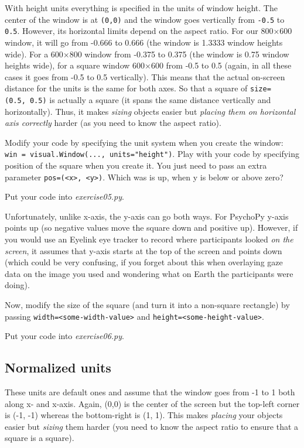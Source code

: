 \documentclass[
]{book}
\begin{document}
With height units everything is specified in the units of window height. The center of the window is at \texttt{(0,0)} and the window goes vertically from \texttt{-0.5} to \texttt{0.5}. However, its horizontal limits depend on the aspect ratio. For our 800×600 window, it will go from -0.666 to 0.666 (the window is 1.3333 window heights wide). For a 600×800 window from -0.375 to 0.375 (the window is 0.75 window heights wide), for a square window 600×600 from -0.5 to 0.5 (again, in all these cases it goes from -0.5 to 0.5 vertically). This means that the actual on-screen distance for the units is the same for both axes. So that a square of \texttt{size=(0.5,\ 0.5)} is actually a square (it spans the same distance vertically and horizontally). Thus, it makes \emph{sizing} objects easier but \emph{placing them on horizontal axis correctly} harder (as you need to know the aspect ratio).

Modify your code by specifying the unit system when you create the window: \texttt{win\ =\ visual.Window(...,\ units="height")}. Play with your code by specifying position of the square when you create it. You just need to pass an extra parameter \texttt{pos=(\textless{}x\textgreater{},\ \textless{}y\textgreater{})}. Which was is up, when y is below or above zero?

Put your code into \emph{exercise05.py}.

Unfortunately, unlike x-axis, the y-axis can go both ways. For PsychoPy y-axis points up (so negative values move the square down and positive up). However, if you would use an Eyelink eye tracker to record where participants looked \emph{on the screen}, it assumes that y-axis starts at the top of the screen and points down (which could be very confusing, if you forget about this when overlaying gaze data on the image you used and wondering what on Earth the participants were doing).

Now, modify the size of the square (and turn it into a non-square rectangle) by passing \texttt{width=\textless{}some-width-value\textgreater{}} and \texttt{height=\textless{}some-height-value\textgreater{}}.

Put your code into \emph{exercise06.py}.

\hypertarget{normalized-units}{%
\subsection{Normalized units}\label{normalized-units}}

These units are default ones and assume that the window goes from -1 to 1 both along x- and x-axis. Again, (0,0) is the center of the screen but the top-left corner is (-1, -1) whereas the bottom-right is (1, 1). This makes \emph{placing} your objects easier but \emph{sizing} them harder (you need to know the aspect ratio to ensure that a square is a square).
\end{document}
